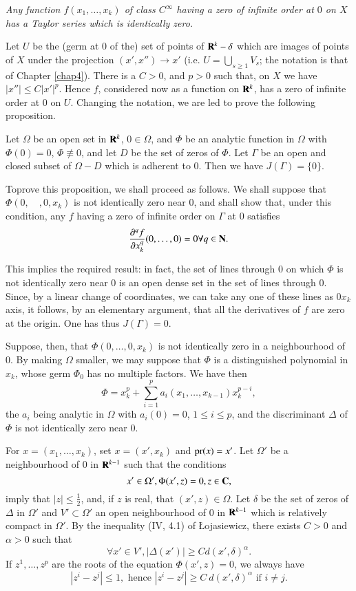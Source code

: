 {\em Any function $f(x_{1},\ldots,x_{k})$ of class $C^{\infty}$ having a zero of infinite order at $0$ on $X$ has a Taylor series which is identically zero.}

Let $U$ be the (germ at $0$ of the) set of points of $\mathbf{R}^{k}-\delta$ which are images of points of $X$ under the projection $(x',x'')\to x'$ (i.e. $U=\bigcup\limits_{s\geq 1}V_{s}$; the notation is that of Chapter \ref{chap4}). There is a $C>0$, and $p>0$ such that, on $X$ we have $|x''|\leq C|x'|^{p}$. Hence $f$, considered now as a function on $\mathbf{R}^{k}$, has a zero of infinite order at $0$ on $U$. Changing the notation, we are led to prove the following proposition.

\begin{proposition}\label{chap6-prop3.6}
Let $\Omega$ be an open set in $\mathbf{R}^{k}$, $0\in \Omega$, and $\Phi$ be an analytic function in $\Omega$ with $\Phi(0)=0$, $\Phi\nequiv 0$, and let $D$ be the set of zeros of $\Phi$. Let $\Gamma$ be an open and closed subset of $\Omega-D$ which is adherent to $0$. Then we have $J(\Gamma)=\{0\}$.
\end{proposition}

To\pageoriginale prove this proposition, we shall proceed as follows. We shall suppose that $\Phi(0,\quad,0,x_{k})$ is not identically zero near $0$, and shall show that, under this condition, any $f$ having a zero of infinite order on $\Gamma$ at $0$ satisfies
$$
\dfrac{\partial^{q}f}{\partial x^{q}_{k}}(0,\ldots,0)=0\forall q\in \mathbf{N}.
$$

This implies the required result: in fact, the set of lines through $0$ on which $\Phi$ is not identically zero near $0$ is an open dense set in the set of lines through $0$. Since, by a linear change of coordinates, we can take any one of these lines as $0x_{k}$ axis, it follows, by an elementary argument, that all the derivatives of $f$ are zero at the origin. One has thus $J(\Gamma)=0$.

Suppose, then, that $\Phi(0,\ldots,0,x_{k})$ is not identically zero in a neighbourhood of $0$. By making $\Omega$ smaller, we may suppose that $\Phi$ is a distinguished polynomial in $x_{k}$, whose germ $\Phi_{0}$ has no multiple factors. We have then
$$
\Phi=x^{p}_{k}+\sum\limits^{p}_{i=1}a_{i}(x_{1},\ldots,x_{k-1})x^{p-i}_{k},
$$
the $a_{i}$ being analytic in $\Omega$ with $a_{i}(0)=0$, $1\leq i\leq p$, and the discriminant $\Delta$ of $\Phi$ is not identically zero near $0$.

For $x=(x_{1},\ldots,x_{k})$, set $x=(x',x_{k})$ and $\operatorname{pr}(x)=x'$. Let $\Omega'$ be a neighbourhood of $0$ in $\mathbf{R}^{k-1}$ such that the conditions
$$
x'\in \Omega',\Phi(x',z)=0, z\in \mathbf{C},
$$
imply that $|z|\leq \frac{1}{2}$, and, if $z$ is real, that $(x',z)\in \Omega$. Let $\delta$ be the set of zeros of $\Delta$ in $\Omega'$ and $V'\subset \Omega'$ an open neighbourhood of $0$ in $\mathbf{R}^{k-1}$ which is relatively compact in $\Omega'$. By the inequality (IV, 4.1) of {\L}ojasiewicz, there exists $C>0$ and $\alpha>0$ such that
$$
\forall x'\in V', |\Delta(x')|\geq C d (x',\delta)^{\alpha}.
$$
If $z^{1},\ldots,z^{p}$ are the roots of the equation $\Phi(x',z)=0$, we always have
$$
|z^{i}-z^{j}|\leq 1, \text{ hence } |z^{i}-z^{j}|\geq C \ d(x',\delta)^{\alpha}\text{ if } i\neq j.
$$

